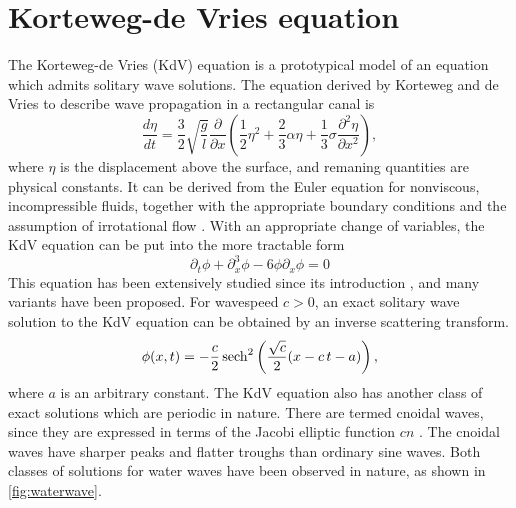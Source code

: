 \documentclass[thesis.tex]{subfiles}
\begin{document}
\section{Korteweg-de Vries equation}

The Korteweg-de Vries (KdV) equation is a prototypical model of an equation which admits solitary wave solutions. The equation derived by Korteweg and de Vries \cite{KdVoriginal} to describe wave propagation in a rectangular canal is  
\[
\frac{d \eta}{dt} = \frac{3}{2} \sqrt{\frac{g}{l}}
\frac{\partial}{\partial x}
\left( \frac{1}{2} \eta^2 + \frac{2}{3} \alpha \eta + \frac{1}{3} \sigma \frac{\partial^2 \eta}{\partial x^2}\right),
\]
where $\eta$ is the displacement above the surface, and remaning quantities are physical constants. It can be derived from the Euler equation for nonviscous, incompressible fluids, together with the appropriate boundary conditions and the assumption of irrotational flow \cite{SolitonPhysics}. With an appropriate change of variables, the KdV equation can be put into the more tractable form
\begin{equation}\label{KdV3}
\partial_t \phi + \partial_x^3 \phi - 6 \phi \partial_x \phi = 0
\end{equation}
This equation has been extensively studied since its introduction \cite{miles1981,drazin1989solitons,SolitonPhysics}, and many variants have been proposed. For wavespeed $c > 0$, an exact solitary wave solution to the KdV equation can be obtained by an inverse scattering transform.
\[
\phi (x,t)=-{\frac {c}{2}}\,\mathrm {sech} ^{2}\left({{\sqrt {c}} \over 2}(x-c\,t-a)\right),
\]
where $a$ is an arbitrary constant. The KdV equation also has another class of exact solutions which are periodic in nature. There are termed cnoidal waves, since they are expressed in terms of the Jacobi elliptic function $cn$ \cite{drazin1989solitons}. The cnoidal waves have sharper peaks and flatter troughs than ordinary sine waves. Both classes of solutions for water waves have been observed in nature, as shown in \cref{fig:waterwave}.
\end{document}
